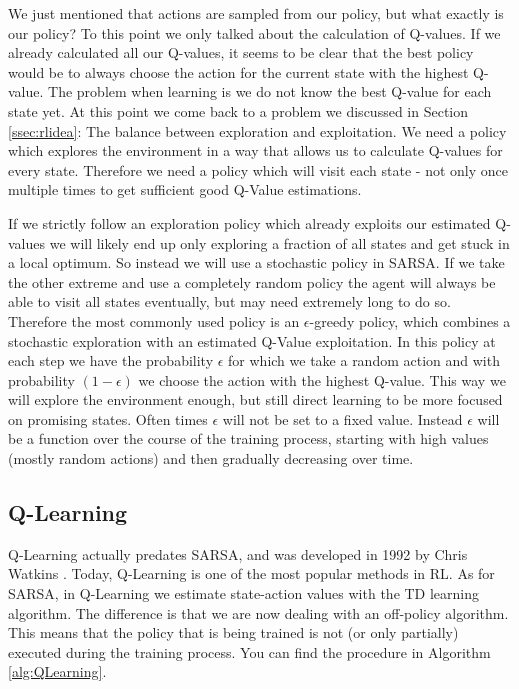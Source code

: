 We just mentioned that actions are sampled from our policy, but what exactly is our policy? To this point we only talked about the calculation of Q-values. If we already calculated all our Q-values, it seems to be clear that the best policy would be to always choose the action for the current state with the highest Q-value. The problem when learning is we do not know the best Q-value for each state yet. At this point we come back to a problem we discussed in Section \ref{ssec:rlidea}: The balance between exploration and exploitation. We need a policy which explores the environment in a way that allows us to calculate Q-values for every state. Therefore we need a policy which will visit each state - not only once multiple times to get sufficient good Q-Value estimations.

If we strictly follow an exploration policy which already exploits our estimated Q-values we will likely end up only exploring a fraction of all states and get stuck in a local optimum. So instead we will use a stochastic policy in SARSA. If we take the other extreme and use a completely random policy the agent will always be able to visit all states eventually, but may need extremely long to do so. Therefore the most commonly used policy is an $\epsilon$-greedy policy, which combines a stochastic exploration with an estimated Q-Value exploitation. In this policy at each step we have the probability $\epsilon$ for which we take a random action and with probability $(1 - \epsilon)$ we choose the action with the highest Q-value. This way we will explore the environment enough, but still direct learning to be more focused on promising states. Often times $\epsilon$ will not be set to a fixed value. Instead $\epsilon$ will be a function over the course of the training process, starting with high values (mostly random actions) and then gradually decreasing over time. 

\subsection{Q-Learning} \label{ssec:Q_Learning}
Q-Learning actually predates SARSA, and was developed in 1992 by Chris Watkins \cite{watkins1992q}. Today, Q-Learning is one of the most popular methods in RL. As for SARSA, in Q-Learning we estimate state-action values with the TD learning algorithm. The difference is that we are now dealing with an off-policy algorithm. This means that the policy that is being trained is not (or only partially) executed during the training process. You can find the procedure in Algorithm \ref{alg:QLearning}.  


